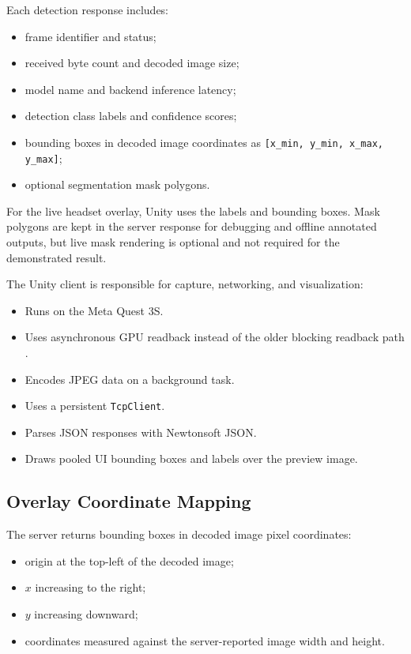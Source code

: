 \documentclass[11pt]{article}
\begin{document}
Each detection response includes:

\begin{itemize}
    \item frame identifier and status;
    \item received byte count and decoded image size;
    \item model name and backend inference latency;
    \item detection class labels and confidence scores;
    \item bounding boxes in decoded image coordinates as \texttt{[x\_min, y\_min, x\_max, y\_max]};
    \item optional segmentation mask polygons.
\end{itemize}

For the live headset overlay, Unity uses the labels and bounding boxes. Mask polygons are kept in the server response for debugging and offline annotated outputs, but live mask rendering is optional and not required for the demonstrated result.

The Unity client is responsible for capture, networking, and visualization:

\begin{itemize}
    \item Runs on the Meta Quest 3S.
    \item Uses asynchronous GPU readback instead of the older blocking readback path \cite{unity-asyncgpu}.
    \item Encodes JPEG data on a background task.
    \item Uses a persistent \texttt{TcpClient}.
    \item Parses JSON responses with Newtonsoft JSON.
    \item Draws pooled UI bounding boxes and labels over the preview image.
\end{itemize}

\subsection{Overlay Coordinate Mapping}

The server returns bounding boxes in decoded image pixel coordinates:

\begin{itemize}
    \item origin at the top-left of the decoded image;
    \item \(x\) increasing to the right;
    \item \(y\) increasing downward;
    \item coordinates measured against the server-reported image width and height.
\end{itemize}
\end{document}
